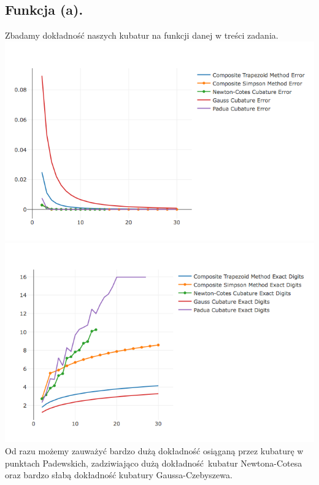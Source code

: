 \documentclass[10pt,wide]{mwart}
\theoremstyle{definition}
\begin{document}
 \subsection{Funkcja (a).}
 Zbadamy dokładność naszych kubatur na funkcji danej w treści zadania.\\
\includegraphics[scale=0.7]{mainfun.png}
\includegraphics[scale=0.7]{mainfund.png}
Od razu możemy zauważyć bardzo dużą dokładność osiąganą przez kubaturę w punktach Padewskich, zadziwiająco dużą dokładność kubatur Newtona-Cotesa oraz bardzo słabą dokładność kubatury Gaussa-Czebyszewa.
\end{document}
